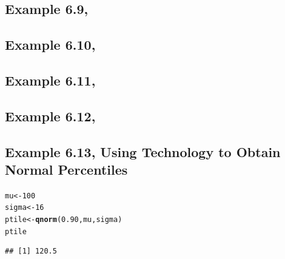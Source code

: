 \documentclass{article}\usepackage[]{graphicx}\usepackage[]{color}
\makeatletter
\newcommand{\hlnum}[1]{\textcolor[rgb]{0.686,0.059,0.569}{#1}}%
\newcommand{\hlstd}[1]{\textcolor[rgb]{0.345,0.345,0.345}{#1}}%
\newcommand{\hlkwb}[1]{\textcolor[rgb]{0.69,0.353,0.396}{#1}}%
\newcommand{\hlkwd}[1]{\textcolor[rgb]{0.737,0.353,0.396}{\textbf{#1}}}%
\newenvironment{kframe}{%
 \def\at@end@of@kframe{}%
 \ifinner\ifhmode%
  \def\at@end@of@kframe{\end{minipage}}%
  \begin{minipage}{\columnwidth}%
 \fi\fi%
 \def\FrameCommand##1{\hskip\@totalleftmargin \hskip-\fboxsep
 \colorbox{shadecolor}{##1}\hskip-\fboxsep
     \hskip-\linewidth \hskip-\@totalleftmargin \hskip\columnwidth}%
 \MakeFramed {\advance\hsize-\width
   \@totalleftmargin\z@ \linewidth\hsize
   \@setminipage}}%
 {\par\unskip\endMakeFramed%
 \at@end@of@kframe}
\newenvironment{knitrout}{}{} %
\makeatother
\begin{document}
\subsection{Example 6.9,}
\subsection{Example 6.10,}
\subsection{Example 6.11,}
\subsection{Example 6.12,}

\subsection{Example 6.13, Using Technology to Obtain Normal Percentiles}
\begin{knitrout}
\color{fgcolor}\begin{kframe}
\begin{alltt}
\hlstd{mu} \hlkwb{<-} \hlnum{100}
\hlstd{sigma} \hlkwb{<-} \hlnum{16}
\hlstd{ptile} \hlkwb{<-} \hlkwd{qnorm}\hlstd{(}\hlnum{0.90}\hlstd{, mu, sigma)}
\hlstd{ptile}
\end{alltt}
\begin{verbatim}
## [1] 120.5
\end{verbatim}
\end{kframe}
\end{knitrout}
\end{document}
